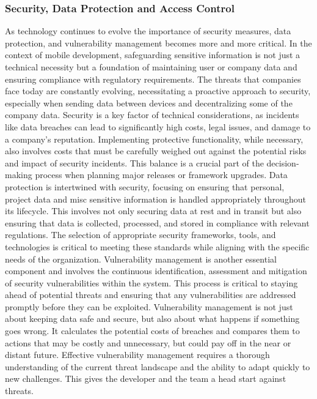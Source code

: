 \subsubsection{Security, Data Protection and Access Control}
As technology continues to evolve the importance of security measures, data protection, and vulnerability management becomes more and more critical. In the context of mobile development, safeguarding sensitive information is not just a technical necessity but a foundation of maintaining user or company data and ensuring compliance with regulatory requirements. The threats that companies face today are constantly evolving, necessitating a proactive approach to security, especially when sending data between devices and decentralizing some of the company data.
\newline \noindent Security is a key factor of technical considerations, as incidents like data breaches can lead to significantly high costs, legal issues, and damage to a company’s reputation. Implementing protective functionality, while necessary, also involves costs that must be carefully weighed out against the potential risks and impact of security incidents. This balance is a crucial part of the decision-making process when planning major releases or framework upgrades.
\newline \noindent Data protection is intertwined with security, focusing on ensuring that personal, project data and misc sensitive information is handled appropriately throughout its lifecycle. This involves not only securing data at rest and in transit but also ensuring that data is collected, processed, and stored in compliance with relevant regulations. The selection of appropriate security frameworks, tools, and technologies is critical to meeting these standards while aligning with the specific needs of the organization.
\newline \noindent Vulnerability management is another essential component and involves the continuous identification, assessment and mitigation of security vulnerabilities within the system. This process is critical to staying ahead of potential threats and ensuring that any vulnerabilities are addressed promptly before they can be exploited. Vulnerability management is not just about keeping data safe and secure, but also about what happens if something goes wrong. It calculates the potential costs of breaches and compares them to actions that may be costly and unnecessary, but could pay off in the near or distant future. Effective vulnerability management requires a thorough understanding of the current threat landscape and the ability to adapt quickly to new challenges. This gives the developer and the team a head start against threats.
